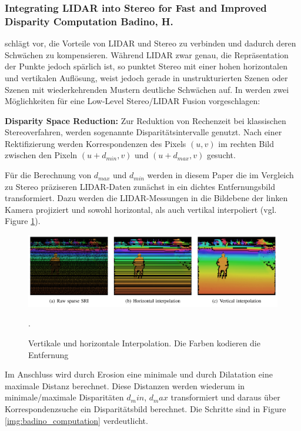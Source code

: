 \documentclass[10pt]{article}
\begin{document}
\subsubsection*{Integrating LIDAR into Stereo for Fast and Improved Disparity Computation Badino, H. \cite{Badino2011a}}

\cite{Badino2011a} schlägt vor, die Vorteile von LIDAR und Stereo zu verbinden und dadurch deren Schwächen zu kompensieren. Während LIDAR zwar genau, die Repräsentation der Punkte jedoch spärlich ist, so punktet Stereo mit einer hohen horizontalen und vertikalen Auflösung, weist jedoch gerade in unstrukturierten Szenen oder Szenen mit wiederkehrenden Mustern deutliche Schwächen auf.
In \cite{Badino2011a} werden zwei Möglichkeiten für eine Low-Level Stereo/LIDAR Fusion vorgeschlagen:

\textbf{Disparity Space Reduction:} Zur Reduktion von Rechenzeit bei klassischen Stereoverfahren, werden sogenannte Disparitätsintervalle genutzt. Nach einer Rektifizierung werden Korrespondenzen des Pixels $(u,v)$ im rechten Bild zwischen den Pixeln $(u+d_{min},v)$ und $(u+d_{max},v)$ gesucht. 

Für die Berechnung von $d_{max}$ und $d_{min}$ werden in diesem Paper die im Vergleich zu Stereo präziseren LIDAR-Daten zunächst in ein dichtes Entfernungsbild transformiert. Dazu werden die LIDAR-Messungen in die Bildebene der linken Kamera projiziert und sowohl horizontal, als auch vertikal interpoliert (vgl. Figure \ref{img:badino_interpolation}).

\begin{figure}[ht]\centering%
	\includegraphics[width=15cm]{images/png/badino_interpolation.png}
	\caption[Badino Interpolation]{ Vertikale und horizontale Interpolation. Die Farben kodieren die Entfernung \cite{Badino2011a} }.
 	\label{img:badino_interpolation}
\end{figure}
Im Anschluss wird durch Erosion eine minimale und durch Dilatation eine maximale Distanz berechnet. Diese Distanzen werden wiederum in minimale/maximale Disparitäten $d_min$, $d_max$ transformiert und daraus über Korrespondenzsuche ein Disparitätsbild berechnet. Die Schritte sind in Figure \ref{img:badino_computation} verdeutlicht.
\end{document}
